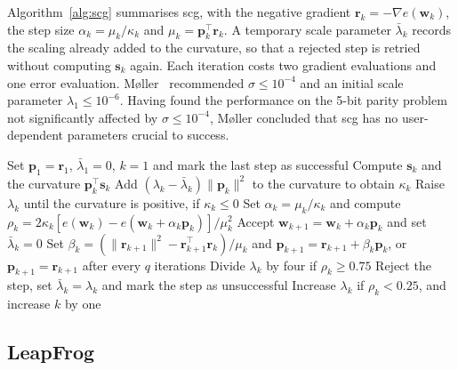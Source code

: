 \documentclass[conference]{IEEEtran}
\newcommand{\vect}[1]{\mathbf{#1}}
\begin{document}
Algorithm~\ref{alg:scg} summarises \gls{scg}, with the negative gradient
$\vect{r}_k = -\nabla e(\vect{w}_k)$, the step size $\alpha_k = \mu_k / \kappa_k$
and $\mu_k = \vect{p}_k^{\top} \vect{r}_k$. A temporary scale parameter
$\bar\lambda_k$ records the scaling already added to the curvature, so that a
rejected step is retried without computing $\vect{s}_k$ again. Each iteration costs two
gradient evaluations and one error evaluation. M{\o}ller~\cite{moller1993}
recommended $\sigma \le 10^{-4}$ and an initial scale parameter
$\lambda_1 \le 10^{-6}$. Having found the performance on the 5-bit parity
problem not significantly affected by $\sigma \le 10^{-4}$, M{\o}ller concluded
that \gls{scg} has no user-dependent parameters crucial to success.

\begin{algorithm}[t]
\caption{Scaled conjugate gradient}
\label{alg:scg}
\begin{algorithmic}[1]
\STATE Set $\vect{p}_1 = \vect{r}_1$, $\bar\lambda_1 = 0$, $k = 1$ and mark the last step as successful
\REPEAT
{}
\STATE Compute $\vect{s}_k$ and the curvature $\vect{p}_k^{\top} \vect{s}_k$
\ENDIF
\STATE Add $(\lambda_k - \bar\lambda_k) \lVert \vect{p}_k \rVert^2$ to the curvature to obtain $\kappa_k$
\STATE Raise $\lambda_k$ until the curvature is positive, if $\kappa_k \le 0$
\STATE Set $\alpha_k = \mu_k / \kappa_k$ and compute $\rho_k = 2 \kappa_k [e(\vect{w}_k) - e(\vect{w}_k + \alpha_k \vect{p}_k)] / \mu_k^2$
\STATE Accept $\vect{w}_{k+1} = \vect{w}_k + \alpha_k \vect{p}_k$ and set $\bar\lambda_k = 0$
\STATE Set $\beta_k = (\lVert \vect{r}_{k+1} \rVert^2 - \vect{r}_{k+1}^{\top} \vect{r}_k) / \mu_k$ and $\vect{p}_{k+1} = \vect{r}_{k+1} + \beta_k \vect{p}_k$, or $\vect{p}_{k+1} = \vect{r}_{k+1}$ after every $q$ iterations
\STATE Divide $\lambda_k$ by four if $\rho_k \ge 0.75$
\ELSE
\STATE Reject the step, set $\bar\lambda_k = \lambda_k$ and mark the step as unsuccessful
\ENDIF
\STATE Increase $\lambda_k$ if $\rho_k < 0.25$, and increase $k$ by one
\end{algorithmic}
\end{algorithm}

\subsection{LeapFrog}
\end{document}
